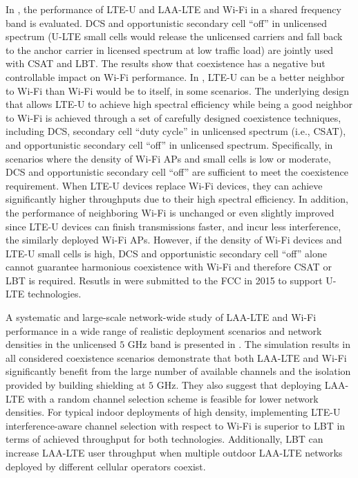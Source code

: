 In \cite{U-LTE-Wi-Fi-Qualcomm-2014, LTE-U-Wi-Fi-LTE-U-Forum-2015, LTE-U-Qualcomm-2015, U-LTE-Wi-Fi-Qualcomm-FCC-2015}, the performance of \mbox{LTE-U} and \mbox{LAA-LTE} and \mbox{Wi-Fi} in a shared frequency band is evaluated. DCS and opportunistic secondary cell ``off'' in unlicensed spectrum (\mbox{U-LTE} small cells would release the unlicensed carriers and fall back to the anchor carrier in licensed spectrum at low traffic load) are jointly used with CSAT and LBT. The results show that coexistence has a negative but controllable impact on \mbox{Wi-Fi} performance. In \cite{U-LTE-Wi-Fi-Qualcomm-2014, LTE-U-Wi-Fi-LTE-U-Forum-2015, LTE-U-Qualcomm-2015}, \mbox{LTE-U} can be a better neighbor to \mbox{Wi-Fi} than \mbox{Wi-Fi} would be to itself, in some scenarios. The underlying design that allows \mbox{LTE-U} to achieve high spectral efficiency while being a good neighbor to \mbox{Wi-Fi} is achieved through a set of carefully designed coexistence techniques, including DCS, secondary cell ``duty cycle'' in unlicensed spectrum (i.e., CSAT), and opportunistic secondary cell ``off'' in unlicensed spectrum. Specifically, in scenarios where the density of \mbox{Wi-Fi} APs and small cells is low or moderate, DCS and opportunistic secondary cell ``off'' are sufficient to meet the coexistence requirement. When \mbox{LTE-U} devices replace \mbox{Wi-Fi} devices, they can achieve significantly higher throughputs due to their high spectral efficiency. In addition, the performance of neighboring \mbox{Wi-Fi} is unchanged or even slightly improved since \mbox{LTE-U} devices can finish transmissions faster, and incur less interference, the similarly deployed \mbox{Wi-Fi} APs. However, if the density of \mbox{Wi-Fi} devices and \mbox{LTE-U} small cells is high, DCS and opportunistic secondary cell ``off'' alone cannot guarantee harmonious coexistence with \mbox{Wi-Fi} and therefore CSAT or LBT is required. Resutls in \cite{LTE-U-Wi-Fi-LTE-U-Forum-2015, U-LTE-Wi-Fi-Qualcomm-FCC-2015} were submitted to the FCC in 2015 to support \mbox{U-LTE} technologies.

A systematic and large-scale network-wide study of \mbox{LAA-LTE} and \mbox{Wi-Fi} performance in a wide range of realistic deployment scenarios and network densities in the unlicensed $5$ GHz band is presented in \cite{LTE-U-ICC-WS-2015}. The simulation results in all considered coexistence scenarios demonstrate that both \mbox{LAA-LTE} and \mbox{Wi-Fi} significantly benefit from the large number of available channels and the isolation provided by building shielding at $5$ GHz. They also suggest that deploying \mbox{LAA-LTE} with a random channel selection scheme is feasible for lower network densities. For typical indoor deployments of high density, implementing \mbox{LTE-U} interference-aware channel selection with respect to \mbox{Wi-Fi} is superior to LBT in terms of achieved throughput for both technologies. Additionally, LBT can increase \mbox{LAA-LTE} user throughput when multiple outdoor \mbox{LAA-LTE} networks deployed by different cellular operators coexist.


